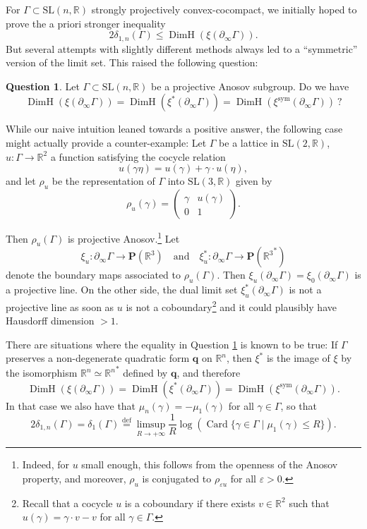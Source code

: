 \documentclass[11pt]{article}
\numberwithin{equation}{section}
\newcommand{\quand}{\quad\text{and}\quad}
\newcommand{\sym}{\mathrm{sym}}
\theoremstyle{definition}
\newtheorem{question}[theo]{Question}
\newcommand{\proj}{\mathbf{P}}
\newcommand{\R}{\mathbb{R}}
\newcommand{\SL}{\mathrm{SL}}
\DeclareMathOperator{\Card}{Card}
\DeclareMathOperator{\DimH}{DimH}
\let\epsilon\varepsilon
\let\G\Gamma
\begin{document}
For $\Gamma\subset \SL(n,\R)$ strongly projectively convex-cocompact, we initially hoped to prove the a priori stronger inequality
\[2 \delta_{1,n}(\Gamma) \leq \DimH(\xi(\partial_\infty \G)).\] But several attempts with slightly different methods always led to a ``symmetric'' version of the limit set. This raised the following question:
\begin{question} \label{ques-HaudorffDimensionSymmetric}
Let $\G \subset \SL(n,\R)$ be a projective Anosov subgroup. Do we have
\[\DimH(\xi(\partial_\infty \G)) = \DimH(\xi^*(\partial_\infty \G)) = \DimH(\xi^{\sym}(\partial_\infty \G))~?\]
\end{question}
While our naive intuition leaned towards a positive answer, the following case might actually provide a counter-example: Let $\Gamma$ be a lattice in $\SL(2,\R)$, $u:\G \to \R^2$ a function satisfying the cocycle relation
\[u(\gamma \eta) = u(\gamma) + \gamma \cdot u(\eta),\]
and let $\rho_u$ be the representation of $\Gamma$ into $\SL(3,\R)$ given by
\[\rho_u(\gamma) = \left( \begin{matrix} \gamma & u(\gamma) \\ 0 & 1\end{matrix} \right).\]

Then $\rho_u(\G)$ is projective Anosov.\footnote{Indeed, for $u$ small enough, this follows from the openness of the Anosov property, and moreover, $\rho_u$ is conjugated to $\rho_{\epsilon u}$ for all $\epsilon>0$.} Let
\[
\xi_u: \partial_\infty \G \to \proj(\R^3)\quand \xi_u^*: \partial_\infty \G \to \proj({\R^3}^*)
\]
denote the boundary maps associated to $\rho_u(\G)$. Then $\xi_u(\partial_\infty\G) = \xi_0(\partial_\infty \G)$ is a projective line. On the other side, the dual limit set $\xi_u^*(\partial_\infty \G)$ is not a projective line as soon as $u$ is not a coboundary\footnote{Recall that a cocycle $u$ is a coboundary if there exists $v\in \R^2$ such that $u(\gamma) = \gamma \cdot v - v$ for all $\gamma \in \G$.} and it could plausibly have Hausdorff dimension $>1$.

There are situations where the equality in Question \ref{ques-HaudorffDimensionSymmetric} is known to be true: If $\G$ preserves a non-degenerate quadratic form $\boldsymbol{q}$ on $\R^n$, then $\xi^*$ is the image of $\xi$ by the isomorphism $\R^n\simeq {\R^n}^*$ defined by $\boldsymbol{q}$, and therefore
\[\DimH(\xi(\partial_\infty \G)) = \DimH(\xi^*(\partial_\infty \G)) = \DimH(\xi^{\sym}(\partial_\infty \G)).\]
In that case we also have that $\mu_n(\gamma) = - \mu_1(\gamma)$ for all $\gamma \in \G$, so that
\[2\delta_{1,n}(\G) = \delta_1(\G) \overset{\textrm{def}}{=} \limsup_{R\to +\infty} \frac{1}{R} \log \left(\Card \{\gamma \in \G \mid \mu_1(\gamma) \leq R\}\right).\]
\end{document}
